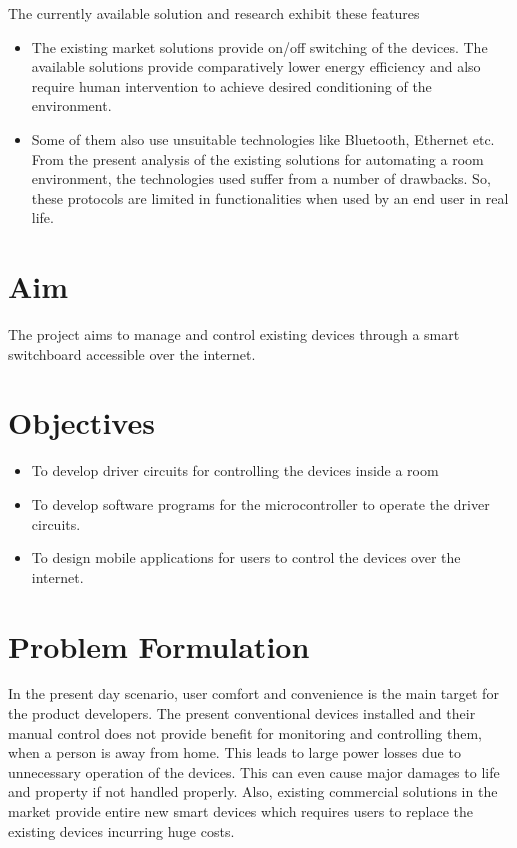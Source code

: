         	The currently available solution and research exhibit these features
        	\begin{itemize}
        		\item The existing market solutions provide on/off switching of the devices. The available solutions provide comparatively lower energy efficiency and also require human intervention to achieve desired conditioning of the environment.
        		\item Some of them also use unsuitable technologies like Bluetooth, Ethernet etc. From the present analysis of the existing solutions for automating a room environment, the technologies used suffer from a number of drawbacks. So, these protocols are limited in functionalities when used by an end user in real life.
        	\end{itemize}
        	
        \section{Aim}
        	The project aims to manage and control existing devices through a smart switchboard accessible over the internet.
        	        \section{Objectives}
	        \begin{itemize}
	        	\item To develop driver circuits for controlling the devices inside a room
                 \item To develop software programs for the microcontroller to operate the driver circuits.
                  \item To design mobile applications for users to control the devices over the internet.
	        \end{itemize}
        \section{Problem Formulation}
        In the present day scenario, user comfort and convenience is the main target for the product developers. The present conventional devices installed and their manual control does not provide benefit for monitoring and controlling them, when a person is away from home. This leads to large power losses due to unnecessary operation of the devices. This can even cause major damages to life and property if not handled properly. Also, existing commercial solutions in the market provide entire new smart devices which requires users to replace the existing devices incurring huge costs. 

